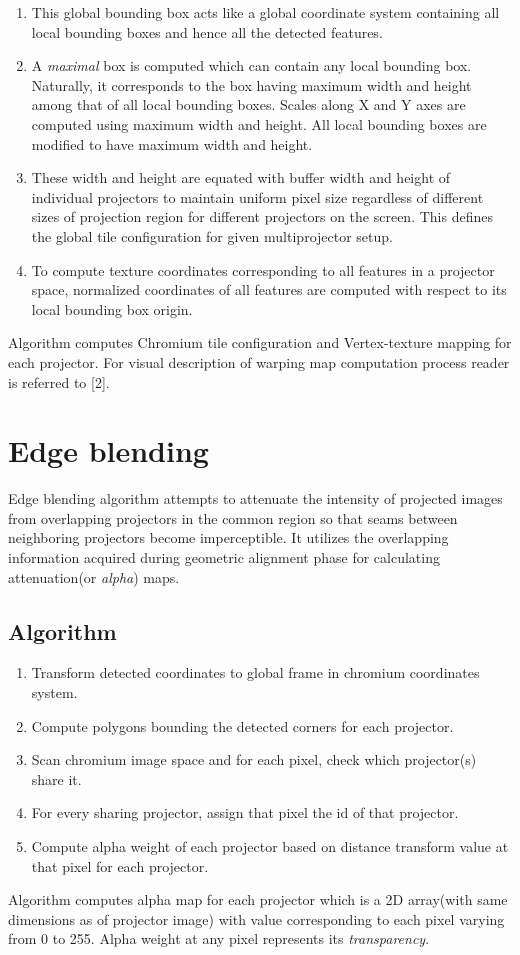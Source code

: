 \documentclass[conference]{/home/pranav/Desktop/Publication_work/latex_class_files/IEEEtran}
\begin{document}
\begin{enumerate}
\begin{enumerate}
\item This global bounding box acts like a global coordinate system containing all local bounding boxes and hence all the 		      detected features. 
\item  A \textit{maximal} box is computed which can contain any local bounding box. Naturally, it corresponds to the box having maximum width and height among that of all local bounding boxes. Scales along X and Y axes are computed using maximum width and height. All local bounding boxes are modified to have maximum width and height.
 
\item These width and height are equated with buffer width and height of individual projectors to maintain uniform pixel size regardless of different sizes of projection region for different projectors on the screen. This defines the global tile configuration for given multiprojector setup.

\item To compute texture coordinates corresponding to all features in a projector space, normalized coordinates of all features are 	            computed with respect to its local bounding box origin.
\end{enumerate}
\end{enumerate}
Algorithm computes Chromium tile configuration and Vertex-texture mapping for each projector. For visual description of warping map computation process reader is referred to [2].

\section{Edge blending}
Edge blending algorithm attempts to attenuate the intensity of projected images from overlapping projectors in the common region so that seams between neighboring projectors become imperceptible. It utilizes the overlapping information acquired during geometric alignment phase for calculating attenuation(or \textit{alpha}) maps.
\subsection{Algorithm}
\begin{enumerate}
\item Transform detected coordinates to global frame in chromium coordinates system.
\item Compute polygons bounding the detected corners for each projector.
\item Scan chromium image space and for each pixel, check which projector(s) share it.
\item For every sharing projector, assign that pixel the id of that projector.
\item Compute alpha weight of each projector based on distance transform value at that pixel for each projector.
\end{enumerate}
Algorithm computes alpha map for each projector which is a 2D array(with same dimensions as of projector image) with value corresponding to each pixel varying from 0 to 255. Alpha weight at any pixel represents its \textit{transparency}.
\end{document}

